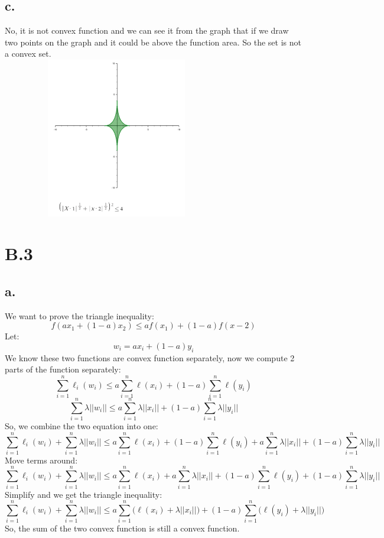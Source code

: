 \documentclass{article}
\begin{document}
\subsection*{c.}
No, it is not convex function and we can see it from the graph that if we draw two points on the graph and it could be above the function area. So the set is not a convex set. \\

\includegraphics[width=10cm, height=7cm]{B2_c.png}



\section*{B.3}

\subsection*{a.}
We want to prove the triangle inequality: 
\[ f(ax_1 + (1-a)x_2) \le af(x_1) + (1-a)f(x-2) \]
Let:
\[ w_i = ax_i + (1-a)y_i \]
We know these two functions are convex function separately, now we compute 2 parts of the function separately:
\[ \sum_{i=1}^{n} \ell_i (w_i) \le a\sum_{i=1}^{n} \ell (x_i) + (1-a)\sum_{i=1}^{n} \ell (y_i) \]
\[ \sum_{i=1}^{n} \lambda ||w_i|| \le  a\sum_{i=1}^{n} \lambda ||x_i|| + (1-a)\sum_{i=1}^{n}\lambda||y_i|| \]
So, we combine the two equation into one:
\[ \sum_{i=1}^{n} \ell_i (w_i) +  \sum_{i=1}^{n} \lambda ||w_i|| \le a\sum_{i=1}^{n} \ell (x_i) + (1-a)\sum_{i=1}^{n} \ell (y_i) + a\sum_{i=1}^{n} \lambda ||x_i|| + (1-a)\sum_{i=1}^{n}\lambda||y_i|| \]
Move terms around:
\[ \sum_{i=1}^{n} \ell_i (w_i) +  \sum_{i=1}^{n} \lambda ||w_i|| \le a\sum_{i=1}^{n} \ell (x_i) + a\sum_{i=1}^{n} \lambda ||x_i|| + (1-a)\sum_{i=1}^{n} \ell (y_i) + (1-a)\sum_{i=1}^{n}\lambda||y_i|| \]
Simplify and we get the triangle inequality:
\[ \sum_{i=1}^{n} \ell_i (w_i) +  \sum_{i=1}^{n} \lambda ||w_i|| \le a\sum_{i=1}^{n} \Big( \ell (x_i) + \lambda ||x_i|| \Big) + (1-a)\sum_{i=1}^{n} \Big(  \ell (y_i) + \lambda||y_i|| \Big) \]
So, the sum of the two convex function is still a convex function.
\end{document}
